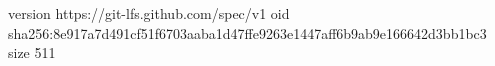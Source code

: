 version https://git-lfs.github.com/spec/v1
oid sha256:8e917a7d491cf51f6703aaba1d47ffe9263e1447aff6b9ab9e166642d3bb1bc3
size 511
